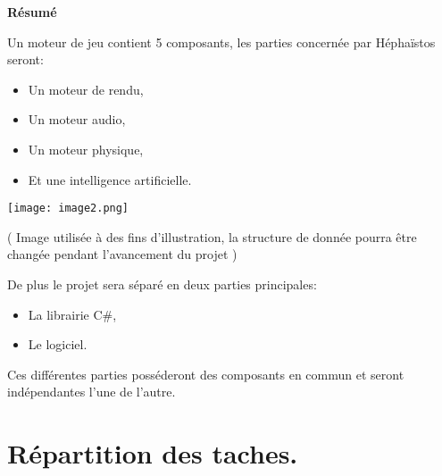 \documentclass[french, 12pt]{article}
\begin{document}
    \begin{center}
    \Large
    \textbf{Résumé}
    \end{center}
 \color{black}\begin{flushleft}
    \normalsize
        \vspace*{1mm}

        Un moteur de jeu contient 5 composants, les parties concernée par Héphaïstos seront: \newline

        \begin{itemize}
            \item Un moteur de rendu,
            \item Un moteur audio,
            \item Un moteur physique,
            \item Et une intelligence artificielle.
        \end{itemize}
    \end{flushleft}
    \begin{center}
            \texttt{[image: image2.png]}
            
            \tiny\color{gray}( Image utilisée à des fins d’illustration, la structure de donnée pourra être changée pendant l'avancement du projet )
    \end{center}
    \color{black}\begin{flushleft}
    \normalsize
        \vspace*{1mm}

        De plus le projet sera séparé en deux parties principales: \newline

        \begin{itemize}
            \item La librairie C\#,
            \item Le logiciel.
        \end{itemize}
        \vspace*{4mm}
 
        Ces différentes parties posséderont des composants en commun et seront indépendantes l’une de l’autre.
    \end{flushleft}
    \newpage


    \color{black}
    \section{Répartition des taches.} 
\end{document}
